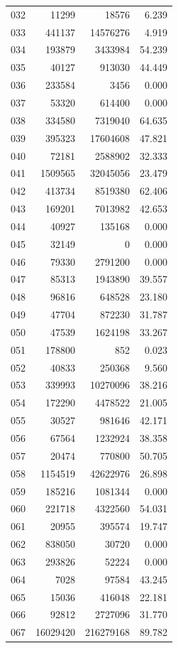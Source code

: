 \documentclass[anonymous,notoc]{gmcm2026}
\begin{document}
\begin{longtable}{lrrr}
032 & 11299 & 18576 & 6.239 \\
033 & 441137 & 14576276 & 4.919 \\
034 & 193879 & 3433984 & 54.239 \\
035 & 40127 & 913030 & 44.449 \\
036 & 233584 & 3456 & 0.000 \\
037 & 53320 & 614400 & 0.000 \\
038 & 334580 & 7319040 & 64.635 \\
039 & 395323 & 17604608 & 47.821 \\
040 & 72181 & 2588902 & 32.333 \\
041 & 1509565 & 32045056 & 23.479 \\
042 & 413734 & 8519380 & 62.406 \\
043 & 169201 & 7013982 & 42.653 \\
044 & 40927 & 135168 & 0.000 \\
045 & 32149 & 0 & 0.000 \\
046 & 79330 & 2791200 & 0.000 \\
047 & 85313 & 1943890 & 39.557 \\
048 & 96816 & 648528 & 23.180 \\
049 & 47704 & 872230 & 31.787 \\
050 & 47539 & 1624198 & 33.267 \\
051 & 178800 & 852 & 0.023 \\
052 & 40833 & 250368 & 9.560 \\
053 & 339993 & 10270096 & 38.216 \\
054 & 172290 & 4478522 & 21.005 \\
055 & 30527 & 981646 & 42.171 \\
056 & 67564 & 1232924 & 38.358 \\
057 & 20474 & 770800 & 50.705 \\
058 & 1154519 & 42622976 & 26.898 \\
059 & 185216 & 1081344 & 0.000 \\
060 & 221718 & 4322560 & 54.031 \\
061 & 20955 & 395574 & 19.747 \\
062 & 838050 & 30720 & 0.000 \\
063 & 293826 & 52224 & 0.000 \\
064 & 7028 & 97584 & 43.245 \\
065 & 15036 & 416048 & 22.181 \\
066 & 92812 & 2727096 & 31.770 \\
067 & 16029420 & 216279168 & 89.782 \\

\end{longtable}
\end{document}
